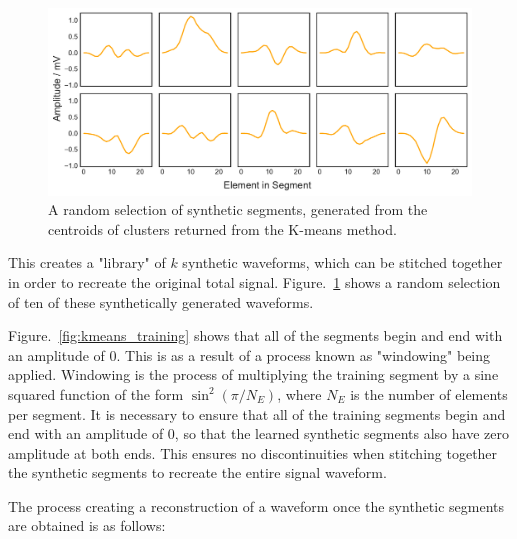\begin{figure}[t]
    \includegraphics[width=1.0\textwidth]{fig/kmeans_synthetic.pdf}
    \caption[K-means synthetic segments]{A random selection of synthetic segments, generated from the centroids of clusters returned from the K-means method.}
    \label{fig:kmeans_synthetic}
\end{figure}

This creates a "library" of $k$ synthetic waveforms, which can be stitched together in order to recreate the original total signal. Figure.~\ref{fig:kmeans_synthetic} shows a random selection of ten of these synthetically generated waveforms.

Figure.~\ref{fig:kmeans_training} shows that all of the segments begin and end with an amplitude of $0$. This is as a result of a process known as "windowing" being applied. Windowing is the process of multiplying the training segment by a sine squared function of the form $\sin^2(\pi/N_E)$, where $N_E$ is the number of elements per segment. It is necessary to ensure that all of the training segments begin and end with an amplitude of $0$, so that the learned synthetic segments also have zero amplitude at both ends. This ensures no discontinuities when stitching together the synthetic segments to recreate the entire signal waveform. 

The process creating a reconstruction of a waveform once the synthetic segments are obtained is as follows:

